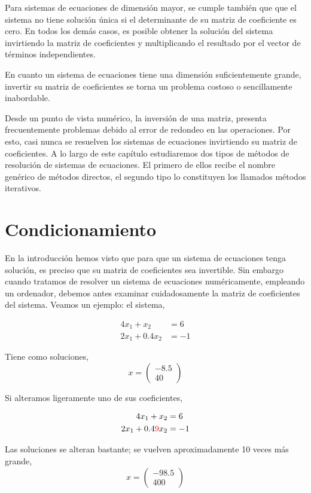 Para sistemas de ecuaciones de dimensión mayor, se cumple también que que el sistema no tiene solución única si el determinante de su matriz de coeficiente es cero. En todos los demás casos, es posible obtener la solución del sistema invirtiendo la matriz de coeficientes y multiplicando el resultado por el vector de términos independientes.

En cuanto un sistema de ecuaciones tiene una dimensión suficientemente grande, invertir su matriz de coeficientes se torna un problema costoso o sencillamente inabordable.

Desde un punto de vista numérico, la inversión de una matriz, presenta frecuentemente problemas debido al error de redondeo en las operaciones. Por esto, casi nunca se resuelven los sistemas de ecuaciones invirtiendo su matriz de coeficientes. A lo largo de este capítulo estudiaremos dos tipos de métodos de resolución de sistemas de ecuaciones. El primero de ellos recibe el nombre genérico de métodos directos, el segundo tipo lo constituyen los llamados métodos iterativos.

\section{Condicionamiento}
En la introducción hemos visto que para que un sistema de ecuaciones tenga solución, es preciso que su matriz de coeficientes sea invertible. Sin embargo cuando tratamos de resolver un sistema de ecuaciones numéricamente, empleando un ordenador, debemos antes examinar cuidadosamente la matriz de coeficientes del sistema. Veamos un ejemplo: el sistema,

\begin{align*}
4x_1+x_2&=6\\
2x_1+0.4 x_2&=-1
\end{align*}

Tiene como soluciones,
\begin{equation*}
x=\begin{pmatrix}
-8.5\\
40
\end{pmatrix}
\end{equation*}

Si alteramos ligeramente uno de sus coeficientes,

\begin{align*}
4x_1+x_2&=6\\
2x_1+0.4{\color{red}9} x_2&=-1
\end{align*}

Las soluciones se alteran bastante;  se vuelven aproximadamente 10 veces más grande,
\begin{equation*}
x=\begin{pmatrix}
-98.5\\
400
\end{pmatrix}
\end{equation*}

